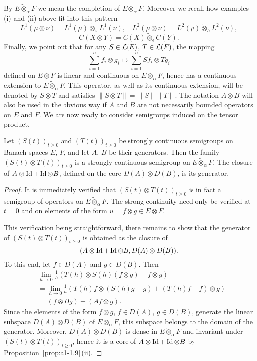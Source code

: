 By $E \widetilde{\otimes}_{\alpha} F$ we mean the completion of $E \otimes_{\alpha} F$. 
Moreover we recall how examples (i) and (ii) above fit into this pattern
\[
    L^{1}(\mu \otimes \nu) = L^{1}(\mu) \widetilde{\otimes}_{\pi} L^{1}(\nu), 
    \quad L^{2}(\mu \otimes \nu) = L^{2}(\mu) \widetilde{\otimes}_{h} L^{2}(\nu),
\]
\[
    C(X \otimes Y) = C(X) \widetilde{\otimes}_{\epsilon} C(Y).
\]
Finally, we point out that for any $S \in \mathcal{L}(E)$, $T \in \mathcal{L}(F) $, the mapping
\[
    \sum_{i=1}^{n}f_{i} \otimes g_{i} \mapsto \sum_{i=1}^{n}Sf_{i} \otimes Tg_{i}
\]
defined on $E \otimes F$ is linear and continuous on $E \otimes_{\alpha} F$, hence has a continuous extension to $ E \widetilde{\otimes}_{\alpha} F$. 
This operator, as well as its continuous extension, will be denoted by $S \otimes T$ and satisfies $\|S \otimes T\| = \|S\|\|T\|$. 
The notation $A \otimes B$ will also be used in the obvious way if $A$ and $B$ are not necessarily bounded operators on $E$ and $F$. 
We are now ready to consider semigroups induced on the tensor product.
\begin{proposition*}\label{prop:a1-3.7}
Let $(S(t))_{t\geq 0}$ and $(T(t))_{t\geq 0}$ be strongly continuous semigroups on Banach spaces $E$, $F$, and let $A$, $B$ be their generators. 
Then the family $(S(t) \otimes T(t))_{t\geq 0}$ is a strongly continuous semigroup on 
$ E \widetilde{\otimes}_{\alpha} F $.
The closure of $A \otimes \operatorname{Id} + \operatorname{Id} \otimes B$, defined on the core $D(A) \otimes D(B)$, is its generator.
\end{proposition*}
\begin{proof}
It is immediately verified that $(S(t)\otimes T(t))_{t\geq 0}$ is in fact a semigroup of operators on 
$ E \widetilde{\otimes}_{\alpha} F $. 
The strong continuity need only be verified at $t = 0$ and on elements of the form $u = f \otimes g \in E \otimes F$.

This verification being straightforward, there remains to show that the generator of $(S(t)\otimes T(t))_{t\geq 0}$ is obtained as the closure of 
%
\[
	(A \otimes \operatorname{Id} + \operatorname{Id} \otimes B,D(A) \otimes D(B)) .
\]
%
To this end, let $f \in D(A)$ and $g \in D(B)$. 
Then
\begin{align*}
    &\lim_{h\to 0} \frac{1}{h}(T(h) \otimes S(h)(f \otimes g)-f \otimes g) \\
    &= \lim_{h\to 0} \frac{1}{h}(T(h)f \otimes (S(h)g-g) + (T(h)f-f) \otimes g) \\
    &= (f \otimes Bg) + (Af \otimes g) .
\end{align*}
Since the elements of the form $f \otimes g$, $f \in D(A)$, $g \in D(B)$, generate the linear subspace $D(A) \otimes D(B)$ of $E \otimes_{\alpha} F$, this subspace belongs
to the domain of the generator.
Moreover, $D(A) \otimes D(B)$ is dense in $E \widetilde{\otimes}_{\alpha} F$ and invariant under $(S(t)\otimes T(t))_{t\geq 0}$, hence it is a core of $A \otimes \operatorname{Id} + \operatorname{Id} \otimes B$ by Proposition~\ref{prop:a1-1.9}\,(ii).
\end{proof}
